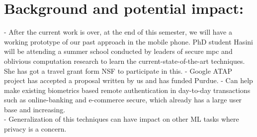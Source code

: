 \documentclass[10pt]{article}
\begin{document}
\section{Background and potential impact:}
- After the current work is over, at the end of this semester, we will have a working prototype of our past approach in the mobile phone. PhD student 
Hasini will be attending a summer school conducted by leaders of secure mpc and oblivious computation research to learn the current-state-of-the-art 
techniques. She has got a travel grant form NSF to participate in this.
- Google ATAP project has accepted a proposal written by us and has funded Purdue.
- Can help make existing biometrics based remote authentication in day-to-day transactions such as online-banking and e-commerce secure, which 
already has a large user base and increasing.\\
- Generalization of this techniques can have impact on other ML tasks where privacy is a concern.



 
\end{document}
